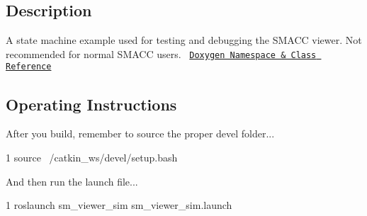 \subsection*{Description}

A state machine example used for testing and debugging the S\+M\+A\+CC viewer. Not recommended for normal S\+M\+A\+CC users.~\newline
 \href{https://reelrbtx.github.io/SMACC_Documentation/master/html/namespacesm__viewer__sim.html}{\tt Doxygen Namespace \& Class Reference}

\subsection*{Operating Instructions}

After you build, remember to source the proper devel folder...


\begin{DoxyCode}
1 source ~/catkin\_ws/devel/setup.bash
\end{DoxyCode}


And then run the launch file...


\begin{DoxyCode}
1 roslaunch sm\_viewer\_sim sm\_viewer\_sim.launch
\end{DoxyCode}
 